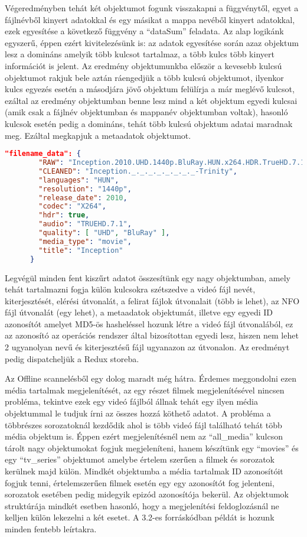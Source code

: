 Végeredményben tehát két objektumot fogunk visszakapni a függvénytől, egyet a fájlnévből kinyert adatokkal és egy másikat a mappa nevéből kinyert adatokkal, ezek egyesítése a következő függvény a ``dataSum'' feladata. Az alap logikánk egyszerű, éppen ezért kivitelezésünk is: az adatok egyesítése során azaz objektum lesz a domináns amelyik több kulcsot tartalmaz, a több kulcs több kinyert információt is jelent. Az eredmény objektumunkba először a kevesebb kulcsú objektumot rakjuk bele aztán ráengedjük a több kulcsú objektumot, ilyenkor kulcs egyezés esetén a másodjára jövő objektum felülírja a már meglévő kulcsot, ezáltal az eredmény objektumban benne lesz mind a két objektum egyedi kulcsai (amik csak a fájlnév objektumban és mappanév objektumban voltak), hasonló kulcsok esetén pedig a domináns, tehát több kulcsú objektum adatai maradnak meg. Ezáltal megkapjuk a metaadatok objektumot.

\begin{lstlisting}[language={json}]
    "filename_data": {
        "RAW": "Inception.2010.UHD.1440p.BluRay.HUN.x264.HDR.TrueHD.7.1-Trinity",
        "CLEANED": "Inception._._._._._._._._-Trinity",
        "languages": "HUN",
        "resolution": "1440p",
        "release_date": 2010,
        "codec": "X264",
        "hdr": true,
        "audio": "TRUEHD.7.1",
        "quality": [ "UHD", "BluRay" ],
        "media_type": "movie",
        "title": "Inception"
      }
\end{lstlisting}

Legvégül minden fent kiszűrt adatot összesítünk egy nagy objektumban, amely tehát tartalmazni fogja külön kulcsokra szétszedve a videó fájl nevét, kiterjesztését, elérési útvonalát, a felirat fájlok útvonalait (több is lehet), az NFO fájl útvonalát (egy lehet), a metaadatok objektumát, illetve egy egyedi ID azonosítót amelyet MD5-ös hasheléssel hozunk létre a videó fájl útvonalából, ez az azonosító az operációs rendszer által bizosítottan egyedi lesz, hiszen nem lehet 2 ugyanolyan nevű és kiterjesztésű fájl ugyanazon az útvonalon. Az eredményt pedig dispatcheljük a Redux storeba.

Az Offline scannelésből egy dolog maradt még hátra. Érdemes meggondolni ezen média tartalmak megjelenítését, az egy részet filmek megjelenítésével nincsen probléma, tekintve ezek egy videó fájlból állnak tehát egy ilyen média objektummal le tudjuk írni az összes hozzá köthető adatot. A probléma a többrészes sorozatoknál kezdődik ahol is több videó fájl található tehát több média objektum is. Éppen ezért megjelenítésnél nem az ``all\_media'' kulcson tárolt nagy objektumokat fogjuk megjeleníteni, hanem készítünk egy ``movies'' és egy ``tv\_series'' objektumot amelybe értelem szerűen a filmek és sorozatok kerülnek majd külön. Mindkét objektumba a média tartalmak ID azonosítóit fogjuk tenni, értelemszerűen filmek esetén egy egy azonosítót fog jelenteni, sorozatok esetében pedig midegyik epizód azonosítója bekerül. Az objektumok struktúrája mindkét esetben hasonló, hogy a megjelenítési feldoglozásnál ne kelljen külön lekezelni a két esetet. A 3.2-es forráskódban példát is hozunk minden fentebb leírtakra.

